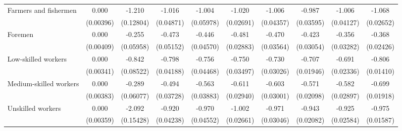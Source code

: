 {\begin{tabular}{l*{9}{c}}
Farmers and fishermen&       0.000         &      -1.210\sym{***}&      -1.016\sym{***}&      -1.004\sym{***}&      -1.020\sym{***}&      -1.006\sym{***}&      -0.987\sym{***}&      -1.006\sym{***}&      -1.068\sym{***}\\
                    &   (0.00396)         &   (0.12804)         &   (0.04871)         &   (0.05978)         &   (0.02691)         &   (0.04357)         &   (0.03595)         &   (0.04127)         &   (0.02652)         \\
Foremen             &       0.000         &      -0.255\sym{***}&      -0.473\sym{***}&      -0.446\sym{***}&      -0.481\sym{***}&      -0.470\sym{***}&      -0.423\sym{***}&      -0.356\sym{***}&      -0.368\sym{***}\\
                    &   (0.00409)         &   (0.05958)         &   (0.05152)         &   (0.04570)         &   (0.02883)         &   (0.03564)         &   (0.03054)         &   (0.03282)         &   (0.02426)         \\
Low-skilled workers &       0.000         &      -0.842\sym{***}&      -0.798\sym{***}&      -0.756\sym{***}&      -0.750\sym{***}&      -0.730\sym{***}&      -0.707\sym{***}&      -0.691\sym{***}&      -0.806\sym{***}\\
                    &   (0.00341)         &   (0.08522)         &   (0.04188)         &   (0.04468)         &   (0.03497)         &   (0.03026)         &   (0.01946)         &   (0.02336)         &   (0.01410)         \\
Medium-skilled workers&       0.000         &      -0.289\sym{***}&      -0.494\sym{***}&      -0.563\sym{***}&      -0.611\sym{***}&      -0.603\sym{***}&      -0.571\sym{***}&      -0.582\sym{***}&      -0.699\sym{***}\\
                    &   (0.00383)         &   (0.06077)         &   (0.03728)         &   (0.03883)         &   (0.02940)         &   (0.03001)         &   (0.02098)         &   (0.02897)         &   (0.01918)         \\
Unskilled workers   &       0.000         &      -2.092\sym{***}&      -0.920\sym{***}&      -0.970\sym{***}&      -1.002\sym{***}&      -0.971\sym{***}&      -0.943\sym{***}&      -0.925\sym{***}&      -0.975\sym{***}\\
                    &   (0.00359)         &   (0.15428)         &   (0.04238)         &   (0.04552)         &   (0.02661)         &   (0.03046)         &   (0.02082)         &   (0.02584)         &   (0.01587)         \\

\end{tabular}}
